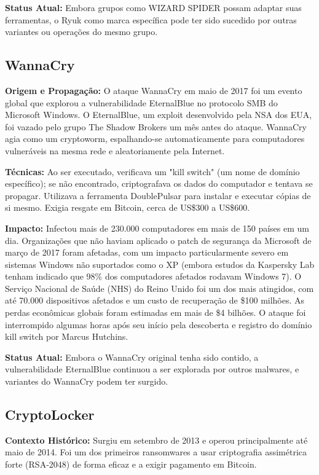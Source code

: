 \textbf{Status Atual:} Embora grupos como WIZARD SPIDER possam adaptar suas ferramentas, o Ryuk como marca específica pode ter sido sucedido por outras variantes ou operações do mesmo grupo.

\subsection{WannaCry}
\textbf{Origem e Propagação:} O ataque WannaCry em maio de 2017 foi um evento global que explorou a vulnerabilidade EternalBlue no protocolo SMB do Microsoft Windows. O EternalBlue, um exploit desenvolvido pela NSA dos EUA, foi vazado pelo grupo The Shadow Brokers um mês antes do ataque. WannaCry agia como um cryptoworm, espalhando-se automaticamente para computadores vulneráveis na mesma rede e aleatoriamente pela Internet.

\textbf{Técnicas:} Ao ser executado, verificava um "kill switch" (um nome de domínio específico); se não encontrado, criptografava os dados do computador e tentava se propagar. Utilizava a ferramenta DoublePulsar para instalar e executar cópias de si mesmo. Exigia resgate em Bitcoin, cerca de US\$300 a US\$600.

\textbf{Impacto:} Infectou mais de 230.000 computadores em mais de 150 países em um dia. Organizações que não haviam aplicado o patch de segurança da Microsoft de março de 2017 foram afetadas, com um impacto particularmente severo em sistemas Windows não suportados como o XP (embora estudos da Kaspersky Lab tenham indicado que 98\% dos computadores afetados rodavam Windows 7). O Serviço Nacional de Saúde (NHS) do Reino Unido foi um dos mais atingidos, com até 70.000 dispositivos afetados e um custo de recuperação de \$100 milhões. As perdas econômicas globais foram estimadas em mais de \$4 bilhões. O ataque foi interrompido algumas horas após seu início pela descoberta e registro do domínio kill switch por Marcus Hutchins.

\textbf{Status Atual:} Embora o WannaCry original tenha sido contido, a vulnerabilidade EternalBlue continuou a ser explorada por outros malwares, e variantes do WannaCry podem ter surgido.

\subsection{CryptoLocker}
\textbf{Contexto Histórico:} Surgiu em setembro de 2013 e operou principalmente até maio de 2014. Foi um dos primeiros ransomwares a usar criptografia assimétrica forte (RSA-2048) de forma eficaz e a exigir pagamento em Bitcoin.

